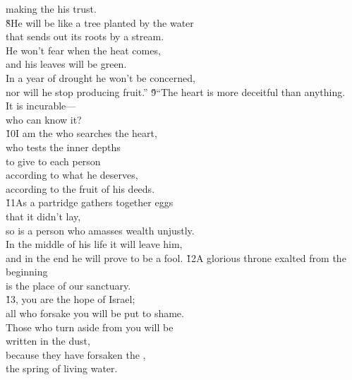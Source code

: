 \begin{poetry}
\poemll    making the  his trust. \\
\poeml \v{8}He will be like a tree planted by the water \\
\poemll    that sends out its roots by a stream. \\
\poeml He won't fear when the heat comes, \\
\poemll    and his leaves will be green. \\
\poeml In a year of drought he won't be concerned, \\
\poemll    nor will he stop producing fruit.''
\poeml \v{9}``The heart is more deceitful than anything. \\
\poemll    It is incurable--- \\
\poemlll       who can know it? \\
\poeml \v{10}I am the  who searches the heart, \\
\poemll    who tests the inner depths \\
\poeml to give to each person \\
\poemll    according to what he deserves, \\
\poemlll       according to the fruit of his deeds. \\
\poeml \v{11}As a partridge gathers together eggs \\
\poemll    that it didn't lay, \\
\poeml so is a person who amasses wealth unjustly. \\
\poemll    In the middle of his life it will leave him, \\
\poemlll       and in the end he will prove to be a fool.
\poeml \v{12}A glorious throne exalted from the beginning \\
\poemll    is the place of our sanctuary. \\
\poeml \v{13}, you are the hope of Israel; \\
\poemll    all who forsake you will be put to shame. \\
\poeml Those who turn aside from you will be \\
\poemll    written in the dust, \\
\poeml because they have forsaken the , \\
\poemll    the spring of living water.

\end{poetry}

